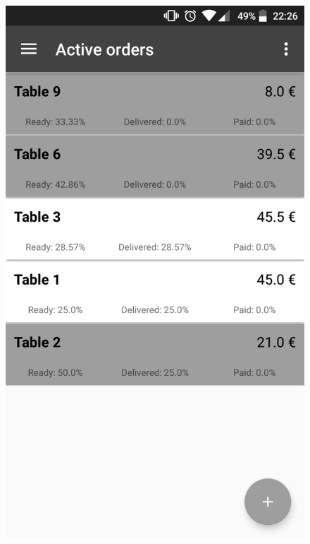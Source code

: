 \begin{figure}[!h]
\centering
\includegraphics[scale=0.15]{Figures/wisebite_screenshot_3.png}

\end{figure}
